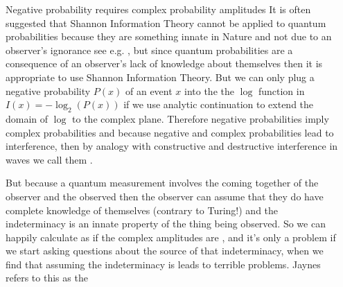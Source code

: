 \documentclass[final]{beamer}
\newlength{\sepwidth}
\newlength{\colwidth}
\newcommand{\separatorcolumn}{\begin{column}{\sepwidth}\end{column}}
\begin{document}
\begin{frame}[t]
\begin{columns}[t]
\begin{column}{\colwidth}
  \begin{block}{Negative probability requires complex probability amplitudes}
 It is often suggested that Shannon Information Theory cannot be applied to quantum probabilities because they are something innate in Nature and not due to an observer's ignorance see e.g. \autocite{brukner_2000_shannon}, but since quantum probabilities are a consequence of an observer's lack of knowledge about themselves then it is appropriate to use Shannon Information Theory. But we can only plug a negative probability $P(x)$ of an event $x$ into the the $\log$ function in $I(x) = -\log_2(P(x))$ if we use analytic continuation to extend the domain of $\log$ to the complex plane. Therefore negative probabilities imply complex probabilities and because negative and complex probabilities lead to interference, then by analogy with constructive and destructive interference in waves we call them .
 
 \par
 But because a quantum measurement involves the coming together of the observer and the observed then the observer can assume that they do have complete knowledge of themselves (contrary to Turing!) and the indeterminacy is an innate property of the thing being observed. So we can happily calculate as if the complex amplitudes are , and it's only a problem if we start asking questions about the source of that indeterminacy, when we find that assuming the indeterminacy is  leads to terrible problems. Jaynes \autocite{Jaynes1989} refers to this as the  
  \end{block}
 
\end{column}

\separatorcolumn


\end{columns}
\end{frame}
\end{document}
